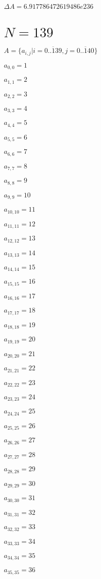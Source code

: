 \documentclass[a4paper,12pt]{article}
\begin{document}
$\Delta A = 6.917786472619486e236$



\section{ $N = 139$ }
$A = \{ a _{ i, j } | i = \overline { 0..139 }, j = \overline { 0..140 } \}$

$a _{ 0, 0 } = 1$

$a _{ 1, 1 } = 2$

$a _{ 2, 2 } = 3$

$a _{ 3, 3 } = 4$

$a _{ 4, 4 } = 5$

$a _{ 5, 5 } = 6$

$a _{ 6, 6 } = 7$

$a _{ 7, 7 } = 8$

$a _{ 8, 8 } = 9$

$a _{ 9, 9 } = 10$

$a _{ 10, 10 } = 11$

$a _{ 11, 11 } = 12$

$a _{ 12, 12 } = 13$

$a _{ 13, 13 } = 14$

$a _{ 14, 14 } = 15$

$a _{ 15, 15 } = 16$

$a _{ 16, 16 } = 17$

$a _{ 17, 17 } = 18$

$a _{ 18, 18 } = 19$

$a _{ 19, 19 } = 20$

$a _{ 20, 20 } = 21$

$a _{ 21, 21 } = 22$

$a _{ 22, 22 } = 23$

$a _{ 23, 23 } = 24$

$a _{ 24, 24 } = 25$

$a _{ 25, 25 } = 26$

$a _{ 26, 26 } = 27$

$a _{ 27, 27 } = 28$

$a _{ 28, 28 } = 29$

$a _{ 29, 29 } = 30$

$a _{ 30, 30 } = 31$

$a _{ 31, 31 } = 32$

$a _{ 32, 32 } = 33$

$a _{ 33, 33 } = 34$

$a _{ 34, 34 } = 35$

$a _{ 35, 35 } = 36$
\end{document}
